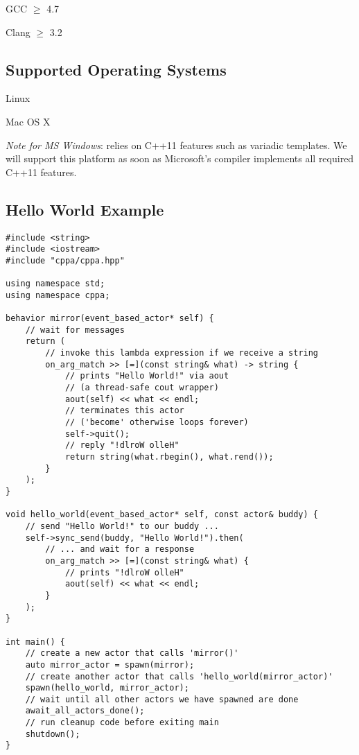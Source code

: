\begin{itemize*}
  \item GCC $\ge$ 4.7
  \item Clang $\ge$ 3.2
\end{itemize*}

\subsection{Supported Operating Systems}

\begin{itemize*}
\item Linux
\item Mac OS X
\item \textit{Note for MS Windows}:
\libcppa relies on C++11 features such as variadic templates.
We will support this platform as soon as Microsoft's compiler implements all required C++11 features.
\end{itemize*}

\clearpage
\subsection{Hello World Example}

\begin{lstlisting}
#include <string>
#include <iostream>
#include "cppa/cppa.hpp"

using namespace std;
using namespace cppa;

behavior mirror(event_based_actor* self) {
    // wait for messages
    return (
        // invoke this lambda expression if we receive a string
        on_arg_match >> [=](const string& what) -> string {
            // prints "Hello World!" via aout
            // (a thread-safe cout wrapper)
            aout(self) << what << endl;
            // terminates this actor
            // ('become' otherwise loops forever)
            self->quit();
            // reply "!dlroW olleH"
            return string(what.rbegin(), what.rend());
        }
    );
}

void hello_world(event_based_actor* self, const actor& buddy) {
    // send "Hello World!" to our buddy ...
    self->sync_send(buddy, "Hello World!").then(
        // ... and wait for a response
        on_arg_match >> [=](const string& what) {
            // prints "!dlroW olleH"
            aout(self) << what << endl;
        }
    );
}

int main() {
    // create a new actor that calls 'mirror()'
    auto mirror_actor = spawn(mirror);
    // create another actor that calls 'hello_world(mirror_actor)'
    spawn(hello_world, mirror_actor);
    // wait until all other actors we have spawned are done
    await_all_actors_done();
    // run cleanup code before exiting main
    shutdown();
}
\end{lstlisting}
